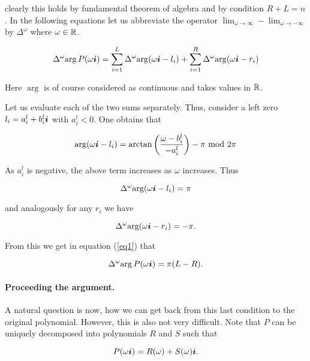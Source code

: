 \documentclass[10pt,a4paper]{article}
\begin{document}
clearly this holds by fundamental theorem of algebra and by condition $R+L=n$. In the following equations let us abbreviate the operator $\lim_{\omega\to\infty}-\lim_{\omega\to-\infty}$ by $\Delta^\omega$ where $\omega\in\mathbb{R}$.

\begin{equation}
\Delta^\omega{\arg{P(\omega\boldsymbol{i})}} = \sum_{i=1}^L{\Delta^\omega{\arg(\omega\boldsymbol{i}-l_i)}}+\sum_{i=1}^R{\Delta^\omega{\arg(\omega\boldsymbol{i}-r_i)}}\label{eq1}
\end{equation}

Here $\arg$ is of course considered as continuous and takes values in $\mathbb{R}$.

Let us evaluate each of the two sums separately. Thus, consider a left zero $l_i=a^l_i+b^l_i\boldsymbol{i}$ with $a^l_i<0$. One obtains that

\begin{equation}
\arg(\omega\boldsymbol{i}-l_i)=\arctan\left(\frac{\omega-b^l_i}{-a^l_i}\right)-\pi \text{ mod }2\pi
\end{equation}

As $a^l_i$ is negative, the above term increases as $\omega$ increases. Thus

\begin{equation}
\Delta^\omega{\arg(\omega\boldsymbol{i}-l_i)}=\pi
\end{equation}

and analogously for any $r_i$ we have

\begin{equation}
\Delta^\omega{\arg(\omega\boldsymbol{i}-r_i)}=-\pi\text{.}
\end{equation}

From this we get in equation (\ref{eq1}) that

\begin{equation}
\Delta^\omega{\arg{P(\omega\boldsymbol{i})}} = \pi(L-R)\text{.}\label{eq2}
\end{equation}

\paragraph{Proceeding the argument.} A natural question is now, how we can get back from this last condition to the original polynomial. However, this is also not very difficult. Note that $P$ can be uniquely decomposed into polynomials $R$ and $S$ such that

\begin{equation}
P(\omega\boldsymbol{i}) = R(\omega)+S(\omega)\boldsymbol{i}\text{.}
\end{equation}
\end{document}
